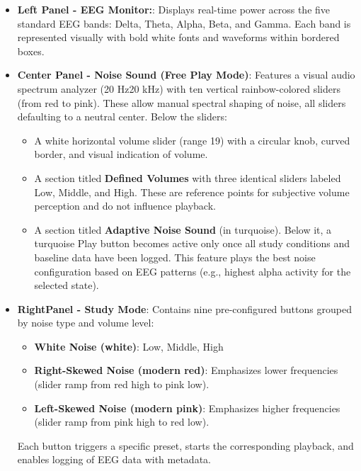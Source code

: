 \begin{itemize}
\item \textbf{Left Panel \textendash{} - EEG Monitor:}: Displays real-time power across the five standard EEG bands: Delta, Theta, Alpha, Beta, and Gamma. Each band is represented visually with bold white fonts and waveforms within bordered boxes.

\item \textbf{Center Panel \textendash{} - Noise Sound (Free Play Mode)}: Features a visual audio spectrum analyzer (20 Hz\textendash{}20 kHz) with ten vertical rainbow-colored sliders (from red to pink). These allow manual spectral shaping of noise, all sliders defaulting to a neutral center. Below the sliders:
\begin{itemize}
\item A white horizontal volume slider (range 1\textendash{}9) with a circular knob, curved border, and visual indication of volume.
\item A section titled \textbf{Defined Volumes} with three identical sliders labeled Low, Middle, and High. These are reference points for subjective volume perception and do not influence playback.
\item A section titled \textbf{Adaptive Noise Sound} (in turquoise). Below it, a turquoise Play button becomes active only once all study conditions and baseline data have been logged. This feature plays the best noise configuration based on EEG patterns (e.g., highest alpha activity for the selected state).
\end{itemize}

\item \textbf{RightPanel  \textendash{} - Study Mode}: Contains nine pre-configured buttons grouped by noise type and volume level:
\begin{itemize}
\item \textbf{White Noise (white)}: Low, Middle, High
\item \textbf{Right-Skewed Noise (modern red)}: Emphasizes lower frequencies (slider ramp from red high to pink low).
\item \textbf{Left-Skewed Noise (modern pink)}: Emphasizes higher frequencies (slider ramp from pink high to red low).
\end{itemize}
Each button triggers a specific preset, starts the corresponding playback, and enables logging of EEG data with metadata.
\end{itemize}

